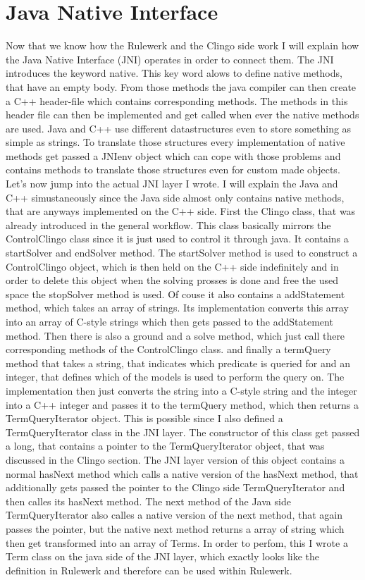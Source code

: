 \documentclass[hyperref, bachelorofscience]{cgvpub}
\begin{document}
\section{Java Native Interface}
Now that we know how the Rulewerk and the Clingo side work I will explain how the Java Native Interface (JNI) operates in order to connect them. The JNI introduces the keyword native. This key word alows to define native methods, that have an empty body. From those methods the java compiler can then create a C++ header-file which contains corresponding methods. The methods in this header file can then be implemented and get called when ever the native methods are used. Java and C++ use different datastructures even to store something as simple as strings. To translate those structures every implementation of native methods get passed a  JNIenv object which can cope with those problems and contains methods to translate those structures even for custom made objects. Let's now jump into the actual JNI layer I wrote. I will explain the Java and C++ simustaneously since the Java side almost only contains native methods, that are anyways implemented on the C++ side. First the Clingo class, that was already introduced in the general workflow. This class basically mirrors the ControlClingo class since it is just used to control it through java. It contains a startSolver and endSolver method. The startSolver method is used to construct a ControlClingo object, which is then held on the C++ side indefinitely and in order to delete this object when the solving prosses is done and free the used space the stopSolver method is used. Of couse it also contains a addStatement method, which takes an array of strings. Its implementation converts this array into an array of C-style strings which then gets passed to the addStatement method. Then there is also a ground and a solve method, which just call there corresponding methods of the ControlClingo class. and finally a termQuery method that takes a string, that indicates which predicate is queried for and an integer, that defines which of the models is used to perform the query on.
The implementation then just converts the string into a C-style string and the integer into a C++ integer and passes it to the termQuery method, which then returns a TermQueryIterator object. This is possible since I also defined a TermQueryIterator class in the JNI layer. The constructor of this class get passed a long, that contains a pointer to the TermQueryIterator object, that was discussed in the Clingo section. The JNI layer version of this object contains a normal hasNext method which calls a native version of the hasNext method, that additionally gets passed the pointer to the Clingo side TermQueryIterator and then calles its hasNext method. The next method of the Java side TermQueryIterator also calles a native version of the next method, that again passes the pointer, but the native next method returns a array of string which then get transformed into an array of Terms. In order to perfom, this I wrote a Term class on the java side of the JNI layer, which exactly looks like the definition in Rulewerk and therefore can be used within Rulewerk.
\end{document}
